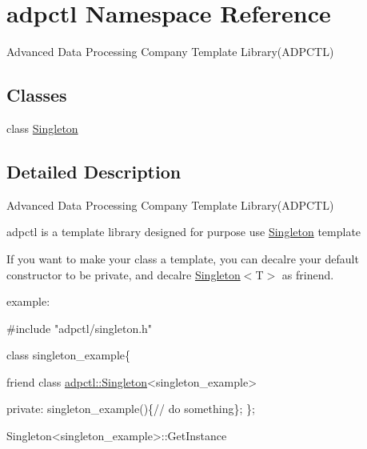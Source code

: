 \hypertarget{namespaceadpctl}{}\section{adpctl Namespace Reference}
\label{namespaceadpctl}


Advanced Data Processing Company Template Library(\+A\+D\+P\+C\+T\+L)  


\subsection*{Classes}
\begin{DoxyCompactItemize}
\item 
class \hyperlink{classadpctl_1_1Singleton}{Singleton}
\end{DoxyCompactItemize}


\subsection{Detailed Description}
Advanced Data Processing Company Template Library(\+A\+D\+P\+C\+T\+L) 

adpctl is a template library designed for purpose use \hyperlink{classadpctl_1_1Singleton}{Singleton} template

If you want to make your class a template, you can decalre your default constructor to be {\ttfamily private}, and decalre {\ttfamily \hyperlink{classadpctl_1_1Singleton}{Singleton}$<$T$>$} as frinend.

example\+: 
\begin{DoxyCode}
\textcolor{preprocessor}{#include "adpctl/singleton.h"}

\textcolor{keyword}{class }singleton\_example\{

\textcolor{keyword}{friend} \textcolor{keyword}{class }\hyperlink{classadpctl_1_1Singleton}{adpctl::Singleton}<singleton\_example>

private:
 singleton\_example()\{\textcolor{comment}{// do something\};}
\};


Singleton<singleton\_example>::GetInstance
\end{DoxyCode}
 